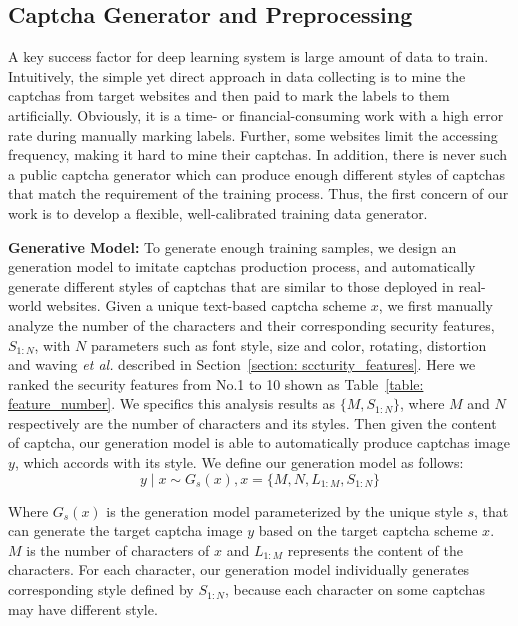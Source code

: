\subsection{Captcha Generator and Preprocessing} \label{section: Captcha_generator}
A key success factor for deep learning system is large amount of data to train.
Intuitively, the simple yet direct approach in data collecting is to mine the captchas from target websites and then paid to mark the labels to them artificially. Obviously, it is a time- or financial-consuming work with a high error rate during manually marking labels.
Further, some websites limit the accessing frequency, making it hard to mine their captchas.
In addition, there is never such a public captcha generator which can produce enough different styles of captchas that match the requirement of the training process.
Thus, the first concern of our work is to develop a flexible, well-calibrated training data generator.

\noindent \textbf{Generative Model:} To generate enough training samples, we design an generation model to imitate captchas production process, and automatically generate different styles of captchas that are similar to those deployed in real-world websites.
Given a unique text-based captcha scheme $x$, we first manually analyze the number of the characters and their corresponding security features, $S_{1:N}$, with $N$ parameters such as font style, size and color, rotating, distortion and waving \emph{et al.} described in Section~\ref{section: sccturity_features}.
Here we ranked the security features from No.1 to 10 shown as Table~\ref{table: feature_number}.
We specifics this analysis results as $\{ M, S_{1:N} \}$, where $M$ and $N$ respectively are the number of characters and its styles.
Then given the content of captcha, our generation model is able to automatically produce captchas image $y$, which accords with its style.
We define our generation model as follows:
\begin{equation}\label{equation: generator_model}
  y \mid x \sim G_s(x),    x = \{M, N, L_{1:M}, S_{1:N} \}
\end{equation}

Where $G_s(x)$ is the generation model parameterized by the unique style $s$, that can generate the target captcha image $y$ based on the target captcha scheme $x$. $M$ is the number of characters of $x$ and $L_{1:M}$ represents the content of the characters. For each character, our generation model individually generates corresponding style defined by $S_{1:N}$, because each character on some captchas may have different style.

